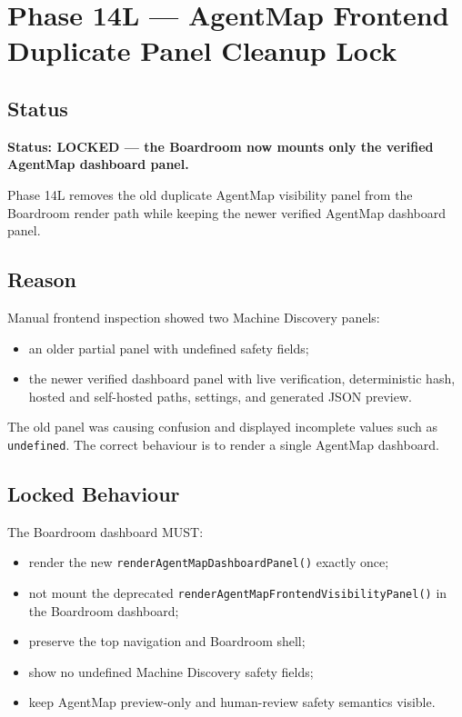 \section{Phase 14L --- AgentMap Frontend Duplicate Panel Cleanup Lock}
\label{sec:phase14-agentmap-frontend-duplicate-cleanup-lock}

\subsection{Status}

\textbf{Status: LOCKED --- the Boardroom now mounts only the verified AgentMap dashboard panel.}

Phase 14L removes the old duplicate AgentMap visibility panel from the Boardroom render path while keeping the newer verified AgentMap dashboard panel.

\subsection{Reason}

Manual frontend inspection showed two Machine Discovery panels:

\begin{itemize}
  \item an older partial panel with undefined safety fields;
  \item the newer verified dashboard panel with live verification, deterministic hash, hosted and self-hosted paths, settings, and generated JSON preview.
\end{itemize}

The old panel was causing confusion and displayed incomplete values such as \texttt{undefined}. The correct behaviour is to render a single AgentMap dashboard.

\subsection{Locked Behaviour}

The Boardroom dashboard MUST:

\begin{itemize}
  \item render the new \texttt{renderAgentMapDashboardPanel()} exactly once;
  \item not mount the deprecated \texttt{renderAgentMapFrontendVisibilityPanel()} in the Boardroom dashboard;
  \item preserve the top navigation and Boardroom shell;
  \item show no undefined Machine Discovery safety fields;
  \item keep AgentMap preview-only and human-review safety semantics visible.
\end{itemize}

